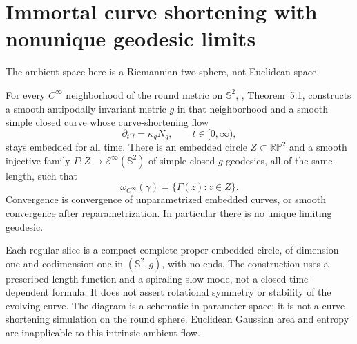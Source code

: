 \chapter{Immortal curve shortening with nonunique geodesic limits}\label{sec:catalogue-aryan-lee}
The ambient space here is a Riemannian two-sphere, not Euclidean space.
\begin{example}\label{ex:catalogue-aryan-lee}
For every $C^\infty$ neighborhood of the round metric on $\mathbb S^2$, \cite{CatAryanLee2026}, Theorem~5.1, constructs a smooth antipodally invariant metric $g$ in that neighborhood and a smooth simple closed curve whose curve-shortening flow
\[
 \partial_t\gamma=\kappa_gN_g,\qquad t\in[0,\infty),
\]
stays embedded for all time. There is an embedded circle $Z\subset\mathbb {RP}^2$ and a smooth injective family $\Gamma:Z\to\mathcal E^\infty(\mathbb S^2)$ of simple closed $g$-geodesics, all of the same length, such that
\[
 \omega_{C^\infty}(\gamma)=\{\Gamma(z):z\in Z\}.
\]
Convergence is convergence of unparametrized embedded curves, or smooth convergence after reparametrization. In particular there is no unique limiting geodesic.

Each regular slice is a compact complete proper embedded circle, of dimension one and codimension one in $(\mathbb S^2,g)$, with no ends. The construction uses a prescribed length function and a spiraling slow mode, not a closed time-dependent formula. It does not assert rotational symmetry or stability of the evolving curve. The diagram is a schematic in parameter space; it is not a curve-shortening simulation on the round sphere. Euclidean Gaussian area and entropy are inapplicable to this intrinsic ambient flow.
\end{example}

